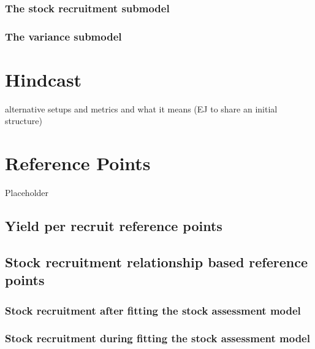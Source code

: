 \documentclass[
]{book}
\begin{document}
\hypertarget{the-stock-recruitment-submodel}{%
\subsection{The stock recruitment submodel}\label{the-stock-recruitment-submodel}}

\hypertarget{the-variance-submodel}{%
\subsection{The variance submodel}\label{the-variance-submodel}}

\hypertarget{hindcast}{%
\chapter{Hindcast}\label{hindcast}}

alternative setups and metrics and what it means (EJ to share an initial structure)

\hypertarget{reference-points}{%
\chapter{Reference Points}\label{reference-points}}

Placeholder

\hypertarget{yield-per-recruit-reference-points}{%
\section{Yield per recruit reference points}\label{yield-per-recruit-reference-points}}

\hypertarget{stock-recruitment-relationship-based-reference-points}{%
\section{Stock recruitment relationship based reference points}\label{stock-recruitment-relationship-based-reference-points}}

\hypertarget{stock-recruitment-after-fitting-the-stock-assessment-model}{%
\subsection{Stock recruitment after fitting the stock assessment model}\label{stock-recruitment-after-fitting-the-stock-assessment-model}}

\hypertarget{stock-recruitment-during-fitting-the-stock-assessment-model}{%
\subsection{Stock recruitment during fitting the stock assessment model}\label{stock-recruitment-during-fitting-the-stock-assessment-model}}
\end{document}
